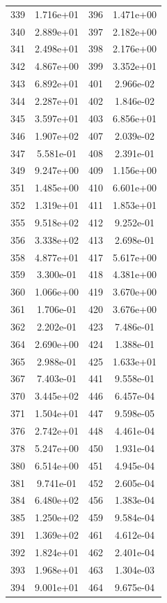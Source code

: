 \documentclass[12pt]{article}
\begin{document}
\begin{longtable}{@{}cccc@{}}
339 & 1.716e+01 & 396 & 1.471e+00 \\
340 & 2.889e+01 & 397 & 2.182e+00 \\
341 & 2.498e+01 & 398 & 2.176e+00 \\
342 & 4.867e+00 & 399 & 3.352e+01 \\
343 & 6.892e+01 & 401 & 2.966e-02 \\
344 & 2.287e+01 & 402 & 1.846e-02 \\
345 & 3.597e+01 & 403 & 6.856e+01 \\
346 & 1.907e+02 & 407 & 2.039e-02 \\
347 & 5.581e-01 & 408 & 2.391e-01 \\
349 & 9.247e+00 & 409 & 1.156e+00 \\
351 & 1.485e+00 & 410 & 6.601e+00 \\
352 & 1.319e+01 & 411 & 1.853e+01 \\
355 & 9.518e+02 & 412 & 9.252e-01 \\
356 & 3.338e+02 & 413 & 2.698e-01 \\
358 & 4.877e+01 & 417 & 5.617e+00 \\
359 & 3.300e-01 & 418 & 4.381e+00 \\
360 & 1.066e+00 & 419 & 3.670e+00 \\
361 & 1.706e-01 & 420 & 3.676e+00 \\
362 & 2.202e-01 & 423 & 7.486e-01 \\
364 & 2.690e+00 & 424 & 1.388e-01 \\
365 & 2.988e-01 & 425 & 1.633e+01 \\
367 & 7.403e-01 & 441 & 9.558e-01 \\
370 & 3.445e+02 & 446 & 6.457e-04 \\
371 & 1.504e+01 & 447 & 9.598e-05 \\
376 & 2.742e+01 & 448 & 4.461e-04 \\
378 & 5.247e+00 & 450 & 1.931e-04 \\
380 & 6.514e+00 & 451 & 4.945e-04 \\
381 & 9.741e-01 & 452 & 2.605e-04 \\
384 & 6.480e+02 & 456 & 1.383e-04 \\
385 & 1.250e+02 & 459 & 9.584e-04 \\
391 & 1.369e+02 & 461 & 4.612e-04 \\
392 & 1.824e+01 & 462 & 2.401e-04 \\
393 & 1.968e+01 & 463 & 1.304e-03 \\
394 & 9.001e+01 & 464 & 9.675e-04 \\

\end{longtable}
\end{document}
